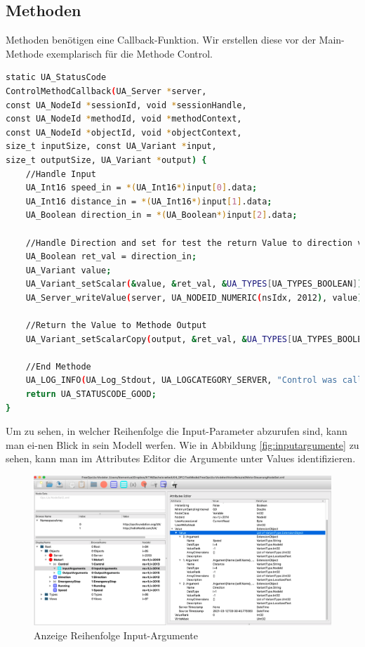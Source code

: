 \subsection{Methoden}
Methoden benötigen eine Callback-Funktion. Wir erstellen diese vor der Main-Methode
exemplarisch für die Methode Control.
\begin{lstlisting}[language=Bash]
static UA_StatusCode
ControlMethodCallback(UA_Server *server,
const UA_NodeId *sessionId, void *sessionHandle,
const UA_NodeId *methodId, void *methodContext,
const UA_NodeId *objectId, void *objectContext,
size_t inputSize, const UA_Variant *input,
size_t outputSize, UA_Variant *output) {
	//Handle Input
	UA_Int16 speed_in = *(UA_Int16*)input[0].data;
	UA_Int16 distance_in = *(UA_Int16*)input[1].data;
	UA_Boolean direction_in = *(UA_Boolean*)input[2].data;
	
	//Handle Direction and set for test the return Value to direction value
	UA_Boolean ret_val = direction_in;
	UA_Variant value;
	UA_Variant_setScalar(&value, &ret_val, &UA_TYPES[UA_TYPES_BOOLEAN]);
	UA_Server_writeValue(server, UA_NODEID_NUMERIC(nsIdx, 2012), value);
	
	//Return the Value to Methode Output
	UA_Variant_setScalarCopy(output, &ret_val, &UA_TYPES[UA_TYPES_BOOLEAN]);
	
	//End Methode
	UA_LOG_INFO(UA_Log_Stdout, UA_LOGCATEGORY_SERVER, "Control was called");
	return UA_STATUSCODE_GOOD;
}
\end{lstlisting}
Um zu sehen, in welcher Reihenfolge die Input-Parameter abzurufen sind, kann man ei-nen Blick in sein Modell werfen. Wie in Abbildung \autoref{fig:inputargumente} zu sehen, kann man im Attributes Editor die Argumente unter Values identifizieren.
\begin{figure}[H]
	\centering
	\includegraphics[width=1\linewidth]{abb/InputArgumente}
	\caption{Anzeige Reihenfolge Input-Argumente}
	\label{fig:inputargumente}
\end{figure}



